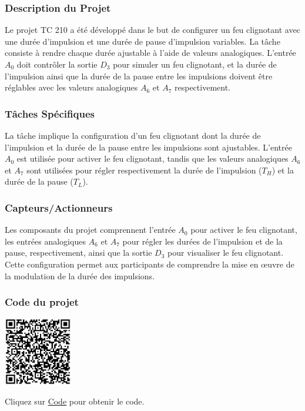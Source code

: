 \documentclass[a4paper,12pt]{report}
\begin{document}
\subsubsection{Description du Projet}

Le projet TC 210 a été développé dans le but de configurer un feu clignotant avec une durée d'impulsion et une durée de pause d'impulsion variables. La tâche consiste à rendre chaque durée ajustable à l'aide de valeurs analogiques. L'entrée \(A_0\) doit contrôler la sortie \(D_3\) pour simuler un feu clignotant, et la durée de l'impulsion ainsi que la durée de la pause entre les impulsions doivent être réglables avec les valeurs analogiques \(A_6\) et \(A_7\) respectivement.

\subsubsection{Tâches Spécifiques}

La tâche implique la configuration d'un feu clignotant dont la durée de l'impulsion et la durée de la pause entre les impulsions sont ajustables. L'entrée \(A_0\) est utilisée pour activer le feu clignotant, tandis que les valeurs analogiques \(A_6\) et \(A_7\) sont utilisées pour régler respectivement la durée de l'impulsion (\(T_H\)) et la durée de la pause (\(T_L\)).

\subsubsection{Capteurs/Actionneurs}

Les composants du projet comprennent l'entrée \(A_0\) pour activer le feu clignotant, les entrées analogiques \(A_6\) et \(A_7\) pour régler les durées de l'impulsion et de la pause, respectivement, ainsi que la sortie \(D_3\) pour visualiser le feu clignotant. Cette configuration permet aux participants de comprendre la mise en œuvre de la modulation de la durée des impulsions.

\subsubsection{Code du projet}

\begin{minipage}{0.5\textwidth}
    \includegraphics[height=3cm]{Code TC210.png}
\end{minipage}%
\begin{minipage}{0.5\textwidth}
    Cliquez sur \href{https://github.com/DexterTaha/Controllino-PLC-Sample/blob/main/TC200/TC210_Modulation_de_Dur%C3%A9e_d'Impulsion/TC210_Modulation_de_Dur%C3%A9e_d'Impulsion.ino}{Code} pour obtenir le code.
\end{minipage}
\end{document}

